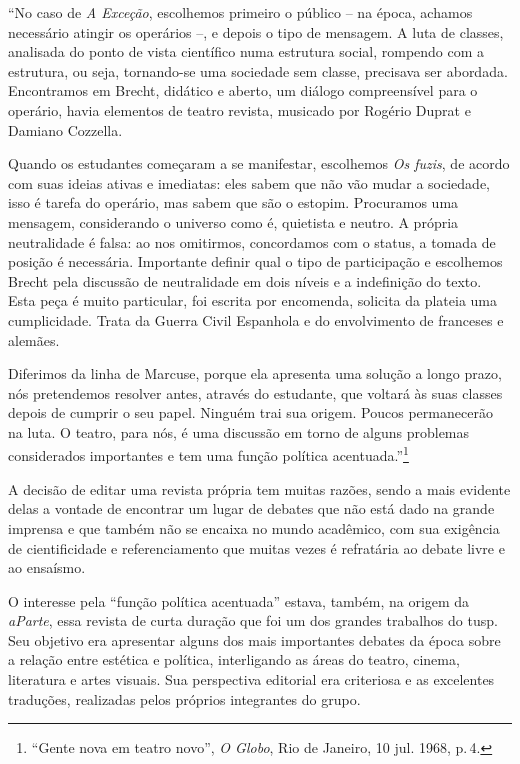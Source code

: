 \startblockquote
“No caso de {\it A Exceção}, escolhemos primeiro o público -- na época,
achamos necessário atingir os operários --, e depois o tipo de mensagem.
A luta de classes, analisada do ponto de vista científico numa estrutura
social, rompendo com a estrutura, ou seja, tornando-se uma sociedade sem
classe, precisava ser abordada. Encontramos em Brecht, didático e
aberto, um diálogo compreensível para o operário, havia elementos de
teatro revista, musicado por Rogério Duprat e Damiano Cozzella.

Quando os estudantes começaram a se manifestar, escolhemos {\it Os
fuzis}, de acordo com suas ideias ativas e imediatas: eles sabem que não
vão mudar a sociedade, isso é tarefa do operário, mas sabem que são o
estopim. Procuramos uma mensagem, considerando o universo como é,
quietista e neutro. A própria neutralidade é falsa: ao nos omitirmos,
concordamos com o status, a tomada de posição é necessária. Importante
definir qual o tipo de participação e escolhemos Brecht pela discussão
de neutralidade em dois níveis e a indefinição do texto. Esta peça é
muito particular, foi escrita por encomenda, solicita da plateia uma
cumplicidade. Trata da Guerra Civil Espanhola e do envolvimento de
franceses e alemães.

Diferimos da linha de Marcuse, porque ela apresenta uma solução a longo
prazo, nós pretendemos resolver antes, através do estudante, que voltará
às suas classes depois de cumprir o seu papel. Ninguém trai sua origem.
Poucos permanecerão na luta. O teatro, para nós, é uma discussão em
torno de alguns problemas considerados importantes e tem uma função
política acentuada.”\footnote{“Gente nova em teatro novo”, {\it O
  Globo}, Rio de Janeiro, 10 jul. 1968, p.\,4.}
\stopblockquote

A decisão de editar uma revista própria tem muitas razões, sendo a mais
evidente delas a vontade de encontrar um lugar de debates que não está
dado na grande imprensa e que também não se encaixa no mundo acadêmico,
com sua exigência de cientificidade e referenciamento que muitas vezes é
refratária ao debate livre e ao ensaísmo.

O interesse pela “função política acentuada” estava, também, na origem
da {\it aParte}, essa revista de curta duração que foi um dos grandes
trabalhos do {\sc tusp}. Seu objetivo era apresentar alguns dos mais
importantes debates da época sobre a relação entre estética e política,
interligando as áreas do teatro, cinema, literatura e artes visuais. Sua
perspectiva editorial era criteriosa e as excelentes traduções,
realizadas pelos próprios integrantes do grupo.


